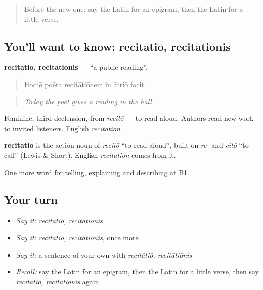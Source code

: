 \begin{quote}
Before the new one: say the Latin for an epigram, then the Latin for a little verse.
\end{quote}

\subsection*{You'll want to know: recitātiō, recitātiōnis}
\textbf{recitātiō, recitātiōnis} — \textquotedblleft{}a public reading\textquotedblright{}.

\begin{quote}
Hodiē poēta recitātiōnem in ātriō facit.
\end{quote}

\begin{quote}
\emph{Today the poet gives a reading in the hall.}
\end{quote}

Feminine, third declension, from \emph{recitō} — to read aloud. Authors read new work to invited listeners. English \emph{recitation}.

\begin{cousinweb}
\textbf{recitātiō} is the action noun of \emph{recitō} \textquotedblleft{}to read aloud\textquotedblright{}, built on \emph{re-} and \emph{citō} \textquotedblleft{}to call\textquotedblright{} (Lewis \& Short). English \emph{recitation} comes from it.
\end{cousinweb}

\begin{grammarlens}[title={What you've built}]
One more word for telling, explaining and describing at B1.
\end{grammarlens}

\subsection*{Your turn}
\begin{itemize}
\raggedright
  \item \emph{Say it:} \emph{recitātiō, recitātiōnis}
  \item \emph{Say it:} \emph{recitātiō, recitātiōnis}, once more
  \item \emph{Say it:} a sentence of your own with \emph{recitātiō, recitātiōnis}
  \item \emph{Recall:} say the Latin for an epigram, then the Latin for a little verse, then say \emph{recitātiō, recitātiōnis} again
\end{itemize}

